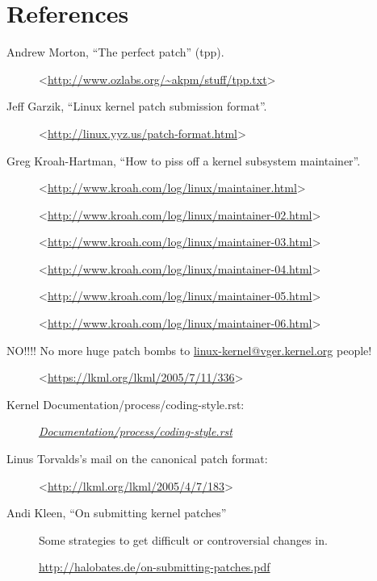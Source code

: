 \documentclass[a4paper,8pt,english]{sphinxmanual}
\begin{document}
\section{References}
\label{process/submitting-patches:references}\begin{description}
\item[{Andrew Morton, ``The perfect patch'' (tpp).}] \leavevmode
\textless{}\href{http://www.ozlabs.org/~akpm/stuff/tpp.txt}{http://www.ozlabs.org/\textasciitilde{}akpm/stuff/tpp.txt}\textgreater{}

\item[{Jeff Garzik, ``Linux kernel patch submission format''.}] \leavevmode
\textless{}\href{http://linux.yyz.us/patch-format.html}{http://linux.yyz.us/patch-format.html}\textgreater{}

\item[{Greg Kroah-Hartman, ``How to piss off a kernel subsystem maintainer''.}] \leavevmode
\textless{}\href{http://www.kroah.com/log/linux/maintainer.html}{http://www.kroah.com/log/linux/maintainer.html}\textgreater{}

\textless{}\href{http://www.kroah.com/log/linux/maintainer-02.html}{http://www.kroah.com/log/linux/maintainer-02.html}\textgreater{}

\textless{}\href{http://www.kroah.com/log/linux/maintainer-03.html}{http://www.kroah.com/log/linux/maintainer-03.html}\textgreater{}

\textless{}\href{http://www.kroah.com/log/linux/maintainer-04.html}{http://www.kroah.com/log/linux/maintainer-04.html}\textgreater{}

\textless{}\href{http://www.kroah.com/log/linux/maintainer-05.html}{http://www.kroah.com/log/linux/maintainer-05.html}\textgreater{}

\textless{}\href{http://www.kroah.com/log/linux/maintainer-06.html}{http://www.kroah.com/log/linux/maintainer-06.html}\textgreater{}

\item[{NO!!!! No more huge patch bombs to \href{mailto:linux-kernel@vger.kernel.org}{linux-kernel@vger.kernel.org} people!}] \leavevmode
\textless{}\href{https://lkml.org/lkml/2005/7/11/336}{https://lkml.org/lkml/2005/7/11/336}\textgreater{}

\item[{Kernel Documentation/process/coding-style.rst:}] \leavevmode
{\hyperref[process/coding\string-style:codingstyle]{\emph{Documentation/process/coding-style.rst}}}

\item[{Linus Torvalds's mail on the canonical patch format:}] \leavevmode
\textless{}\href{http://lkml.org/lkml/2005/4/7/183}{http://lkml.org/lkml/2005/4/7/183}\textgreater{}

\item[{Andi Kleen, ``On submitting kernel patches''}] \leavevmode
Some strategies to get difficult or controversial changes in.

\href{http://halobates.de/on-submitting-patches.pdf}{http://halobates.de/on-submitting-patches.pdf}

\end{description}
\end{document}
